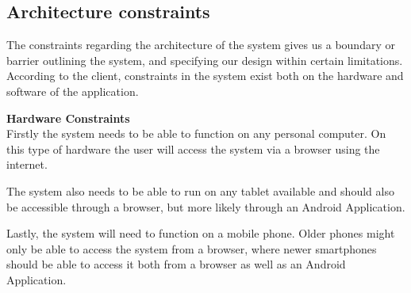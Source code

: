 \documentclass[12pt, a4paper]{scrartcl}
\begin{document}
			\subsection{Architecture constraints}
				The constraints regarding the architecture of the system gives us a boundary or 	barrier outlining the system, and specifying our design within certain limitations.
According to the client, constraints in the system exist both on the hardware and software of the application.

				\textbf{Hardware Constraints}\\
				Firstly the system needs to be able to function on any personal computer. On this type of hardware the user will access the system via a browser using the internet.
 
				The system also needs to be able to run on any tablet available and should also be accessible through a browser, but more likely through an Android Application.

				Lastly, the system will need to function on a mobile phone. Older phones might only be able to access the system from a browser, where newer smartphones should be able to access it both from a browser as well as an Android Application.\pagebreak
				
\end{document}
